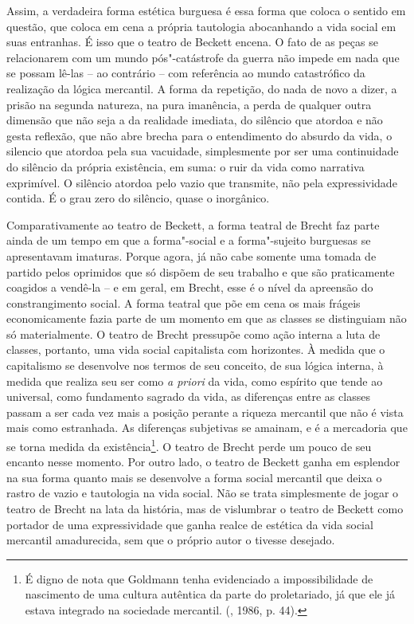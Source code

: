 {Assim, a verdadeira forma estética burguesa é essa forma que coloca o
sentido em questão, que coloca em cena a própria tautologia abocanhando
a vida social em suas entranhas. É isso que o teatro de Beckett encena.
O fato de as peças se relacionarem com um mundo pós"-catástrofe da guerra
não impede em nada que se possam lê-las -- ao contrário -- com
referência ao mundo catastrófico da realização da lógica mercantil. A
forma da repetição, do nada de novo a dizer, a prisão na segunda
natureza, na pura imanência, a perda de qualquer outra dimensão que não
seja a da realidade imediata, do silêncio que atordoa e não gesta
reflexão, que não abre brecha para o entendimento do absurdo da vida, o
silencio que atordoa pela sua vacuidade, simplesmente por ser uma
continuidade do silêncio da própria existência, em suma: o ruir da vida
como narrativa exprimível. O silêncio atordoa pelo vazio que transmite,
não pela expressividade contida. É o grau zero do silêncio, quase o
inorgânico.

Comparativamente ao teatro de Beckett, a forma teatral de Brecht faz
parte ainda de um tempo em que a forma"-social e a forma"-sujeito
burguesas se apresentavam imaturas. Porque agora, já não cabe somente
uma tomada de partido pelos oprimidos que só dispõem de seu trabalho e
que são praticamente coagidos a vendê-la -- e em geral, em Brecht, esse
é o nível da apreensão do constrangimento social. A forma teatral que
põe em cena os mais frágeis economicamente fazia parte de um momento em
que as classes se distinguiam não só materialmente. O teatro de Brecht
pressupõe como ação interna a luta de classes, portanto, uma vida social
capitalista com horizontes. À medida que o capitalismo se desenvolve nos
termos de seu conceito, de sua lógica interna, à medida que realiza seu
ser como \emph{a priori} da vida, como espírito que tende ao universal,
como fundamento sagrado da vida, as diferenças entre as classes passam a
ser cada vez mais a posição perante a riqueza mercantil que não é vista
mais como estranhada. As diferenças subjetivas se amainam, e é a
mercadoria que se torna medida da existência\footnote{É digno de nota
  que Goldmann tenha evidenciado a impossibilidade de nascimento de uma
  cultura autêntica da parte do proletariado, já que ele já estava
  integrado na sociedade mercantil. (, 1986, p. 44).}. O teatro
de Brecht perde um pouco de seu encanto nesse momento. Por outro lado, o
teatro de Beckett ganha em esplendor na sua forma quanto mais se
desenvolve a forma social mercantil que deixa o rastro de vazio e
tautologia na vida social. Não se trata simplesmente de jogar o teatro
de Brecht na lata da história, mas de vislumbrar o teatro de Beckett
como portador de uma expressividade que ganha realce de estética da vida
social mercantil amadurecida, sem que o próprio autor o tivesse
desejado.

}
